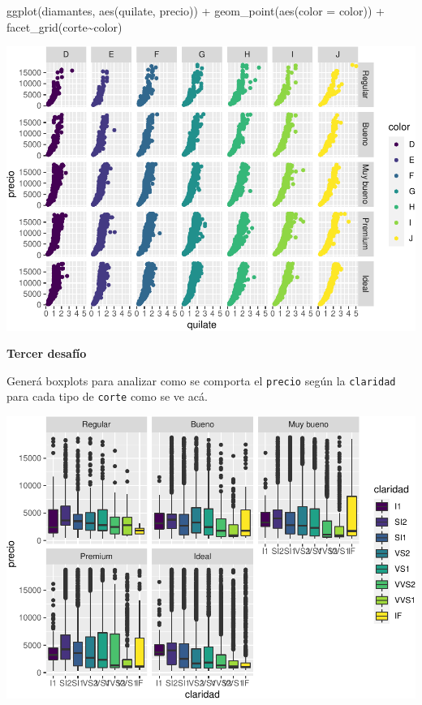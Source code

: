 \documentclass[
  openany]{book}
\newenvironment{Shaded}{\begin{snugshade}}{\end{snugshade}}
\newcommand{\AttributeTok}[1]{\textcolor[rgb]{0.77,0.63,0.00}{#1}}
\newcommand{\FunctionTok}[1]{\textcolor[rgb]{0.00,0.00,0.00}{#1}}
\newcommand{\NormalTok}[1]{#1}
\newcommand{\SpecialCharTok}[1]{\textcolor[rgb]{0.00,0.00,0.00}{#1}}
\begin{document}
\begin{Shaded}
\begin{Highlighting}[]
\FunctionTok{ggplot}\NormalTok{(diamantes, }\FunctionTok{aes}\NormalTok{(quilate, precio)) }\SpecialCharTok{+}
  \FunctionTok{geom\_point}\NormalTok{(}\FunctionTok{aes}\NormalTok{(}\AttributeTok{color =}\NormalTok{ color)) }\SpecialCharTok{+}
  \FunctionTok{facet\_grid}\NormalTok{(corte}\SpecialCharTok{\textasciitilde{}}\NormalTok{color)}
\end{Highlighting}
\end{Shaded}

\begin{center}\includegraphics[width=1\linewidth]{DT6_files/figure-latex/unnamed-chunk-74-1} \end{center}

\textbf{Tercer desafío}

Generá boxplots para analizar como se comporta el \texttt{precio} según la \texttt{claridad} para cada tipo de \texttt{corte} como se ve acá.

\begin{center}\includegraphics[width=1\linewidth]{DT6_files/figure-latex/unnamed-chunk-75-1} \end{center}
\end{document}
